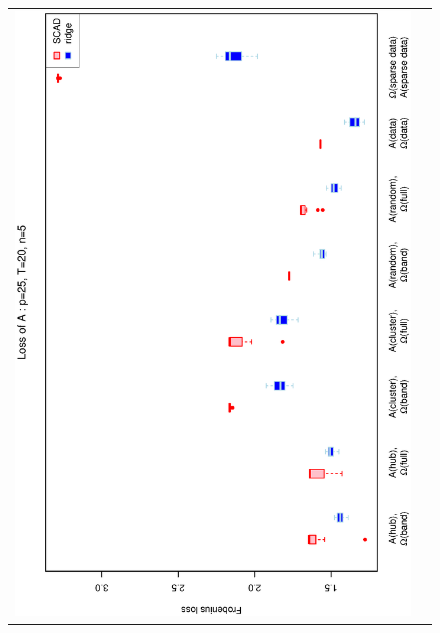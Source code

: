 \documentclass[a4paper]{article}
\begin{document}
\begin{figure}[h!]
\centering
\begin{tabular}{cc}
\includegraphics[scale=0.5,angle=270]{LossA25T20N5.eps}\\

\end{tabular}
\end{figure}
\end{document}
